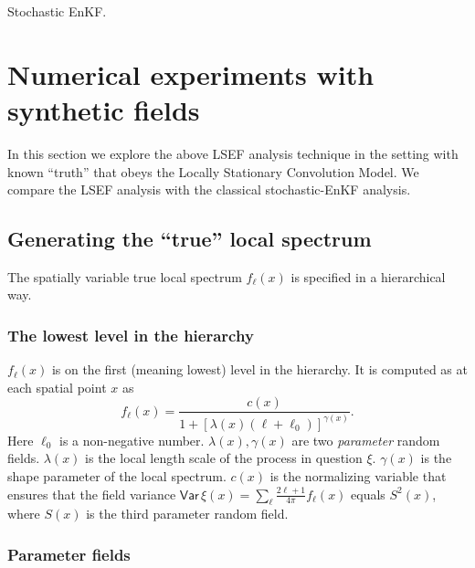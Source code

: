 \documentclass[12pt]{article}
\newcommand{\Var}{{\mathsf{Var}}\,}
\begin{document}
Stochastic EnKF.






\section{Numerical experiments with synthetic fields}
\label{sec_synthData}




In this section we explore the above LSEF analysis technique in the setting with 
known ``truth'' that obeys the Locally Stationary Convolution Model.
We compare the LSEF analysis with the classical stochastic-EnKF analysis.



\subsection {Generating the ``true'' local spectrum}
\label{sec_true_spec}




The spatially variable true local spectrum $f_\ell(x)$ is specified in a hierarchical way.



\subsubsection {The lowest level in the hierarchy}
\label{sec_low_hier}





$f_\ell(x)$ is on the first (meaning lowest) level in the hierarchy. It is computed as at each spatial point $x$ as
%
\begin {equation}
\label{bnx}
f_\ell(x) =  \frac{c(x)} {1 + \left[\lambda(x) (\ell + \ell_0) \right]^{\gamma(x)}}.
\end {equation}
%
Here $\ell_0$ is a non-negative number. $\lambda(x),\gamma(x)$ are two {\em parameter} random fields. 
$\lambda(x)$ is the local length scale of the process in question $\xi$.
$\gamma(x)$ is the  shape parameter of the local spectrum.
$c(x)$ is the normalizing variable that ensures that the field variance 
$\Var\xi(x) =  \sum_\ell \frac{2\ell +1}{4\pi}  f_\ell(x)$ equals $S^2(x)$, 
where $S(x)$ is the third parameter random field.




\subsubsection {Parameter  fields}
\label{sec_prm_flds}
\end{document}
